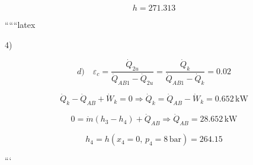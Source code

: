 \[
h = 271.313
\]

``````latex

4)

\begin{equation}
d) \quad \varepsilon_c = \frac{\dot{Q}_{2u}}{\dot{Q}_{AB1} - \dot{Q}_{2u}} = \frac{\dot{Q}_k}{\dot{Q}_{AB1} - \dot{Q}_k} = 0.02
\end{equation}

\begin{equation}
\dot{Q}_k - \dot{Q}_{AB} + \dot{W}_k = 0 \Rightarrow \dot{Q}_k = \dot{Q}_{AB} - \dot{W}_k = 0.652 \, \text{kW}
\end{equation}

\begin{equation}
0 = \dot{m} (h_3 - h_4) + \dot{Q}_{AB} \Rightarrow \dot{Q}_{AB} = 28.652 \, \text{kW}
\end{equation}

\begin{equation}
h_4 = h \left( x_4 = 0, \, p_4 = 8 \, \text{bar} \right) = 264.15
\end{equation}

```